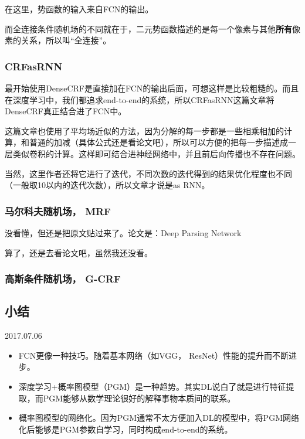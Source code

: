 在这里，势函数的输入来自FCN的输出。

而全连接条件随机场的不同就在于，二元势函数描述的是每一个像素与其他\textbf{所有}像素的关系，所以叫“全连接”。 

\subsubsection{CRFasRNN}

最开始使用DenseCRF是直接加在FCN的输出后面，可想这样是比较粗糙的。而且在深度学习中，我们都追求end-to-end的系统，所以CRFasRNN这篇文章将DenseCRF真正结合进了FCN中。

这篇文章也使用了平均场近似的方法，因为分解的每一步都是一些相乘相加的计算，和普通的加减（具体公式还是看论文吧），所以可以方便的把每一步描述成一层类似卷积的计算。这样即可结合进神经网络中，并且前后向传播也不存在问题。

当然，这里作者还将它进行了迭代，不同次数的迭代得到的结果优化程度也不同（一般取10以内的迭代次数），所以文章才说是as RNN。

\subsubsection{马尔科夫随机场， MRF}

没看懂，但还是把原文贴过来了。论文是：Deep Parsing Network

算了，还是去看论文吧，虽然我还没看。

\subsubsection{高斯条件随机场， G-CRF}

\subsection{小结}

2017.07.06

\begin{itemize}
\item FCN更像一种技巧。随着基本网络（如VGG， ResNet）性能的提升而不断进步。
\item 深度学习+概率图模型（PGM）是一种趋势。其实DL说白了就是进行特征提取，而PGM能够从数学理论很好的解释事物本质间的联系。 
\item 概率图模型的网络化。因为PGM通常不太方便加入DL的模型中，将PGM网络化后能够是PGM参数自学习，同时构成end-to-end的系统。

\end{itemize}

